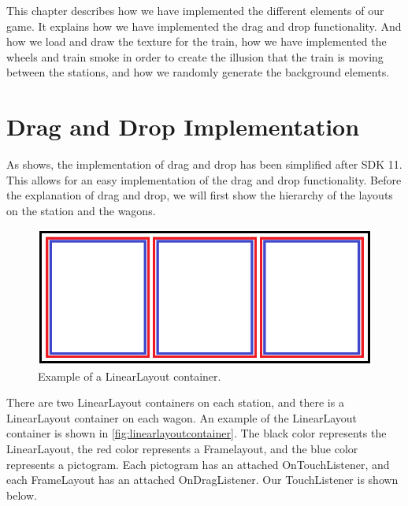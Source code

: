 This chapter describes how we have implemented the different elements of our game. It explains how we have implemented the drag and drop functionality. And how we load and draw the texture for the train, how we have implemented the wheels and train smoke in order to create the illusion that the train is moving between the stations, and how we randomly generate the background elements.

\section{Drag and Drop Implementation}
\label{sec:implementationdraganddrop}
As  shows, the implementation of drag and drop has been simplified after SDK 11. This allows for an easy implementation of the drag and drop functionality. Before the explanation of drag and drop, we will first show the hierarchy of the layouts on the station and the wagons.
\begin{figure}[H]
\centering
\includegraphics[width=0.9\linewidth]{img/layoutexample.png}%
\caption{Example of a LinearLayout container.}
\label{fig:linearlayoutcontainer}
\end{figure}
There are two LinearLayout containers on each station, and there is a LinearLayout container on each wagon. An example of the LinearLayout container is shown in \autoref{fig:linearlayoutcontainer}. The black color represents the LinearLayout, the red color represents a Framelayout, and the blue color represents a pictogram. Each pictogram has an attached OnTouchListener, and each FrameLayout has an attached OnDragListener. Our TouchListener is shown below.

